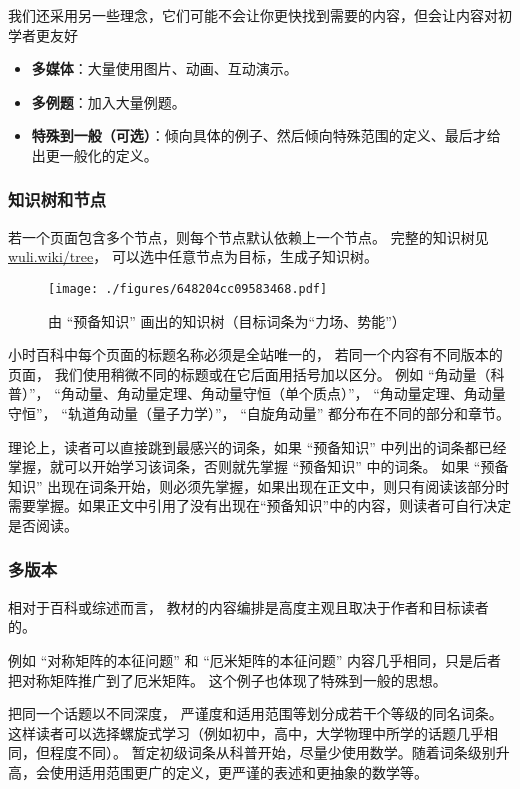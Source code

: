 我们还采用另一些理念，它们可能不会让你更快找到需要的内容，但会让内容对初学者更友好
\begin{itemize}
\item \textbf{多媒体}：大量使用图片、动画、互动演示。
\item \textbf{多例题}：加入大量例题。
\item \textbf{特殊到一般（可选）}：倾向具体的例子、然后倾向特殊范围的定义、最后才给出更一般化的定义。
\end{itemize}


\subsubsection{知识树和节点}
若一个页面包含多个节点，则每个节点默认依赖上一个节点。 完整的知识树见 \href{https://wuli.wiki/tree}{wuli.wiki/tree}， 可以选中任意节点为目标，生成子知识树。

\begin{figure}[ht]
\centering
\texttt{[image: ./figures/648204cc09583468.pdf]}
\caption{由 “预备知识” 画出的知识树（目标词条为“力场、势能”）}\label{fig_about_1}
\end{figure}

小时百科中每个页面的标题名称必须是全站唯一的， 若同一个内容有不同版本的页面， 我们使用稍微不同的标题或在它后面用括号加以区分。 例如 “角动量（科普）”， “角动量、角动量定理、角动量守恒（单个质点）”， “角动量定理、角动量守恒”， “轨道角动量（量子力学）”， “自旋角动量” 都分布在不同的部分和章节。

理论上，读者可以直接跳到最感兴的词条，如果 “预备知识” 中列出的词条都已经掌握，就可以开始学习该词条，否则就先掌握 “预备知识” 中的词条。 如果 “预备知识” 出现在词条开始，则必须先掌握，如果出现在正文中，则只有阅读该部分时需要掌握。如果正文中引用了没有出现在“预备知识”中的内容，则读者可自行决定是否阅读。

\subsubsection{多版本}
相对于百科或综述而言， 教材的内容编排是高度主观且取决于作者和目标读者的。

例如 “对称矩阵的本征问题” 和 “厄米矩阵的本征问题” 内容几乎相同，只是后者把对称矩阵推广到了厄米矩阵。 这个例子也体现了特殊到一般的思想。

把同一个话题以不同深度， 严谨度和适用范围等划分成若干个等级的同名词条。 这样读者可以选择螺旋式学习（例如初中，高中，大学物理中所学的话题几乎相同，但程度不同）。 暂定初级词条从科普开始，尽量少使用数学。随着词条级别升高，会使用适用范围更广的定义，更严谨的表述和更抽象的数学等。

